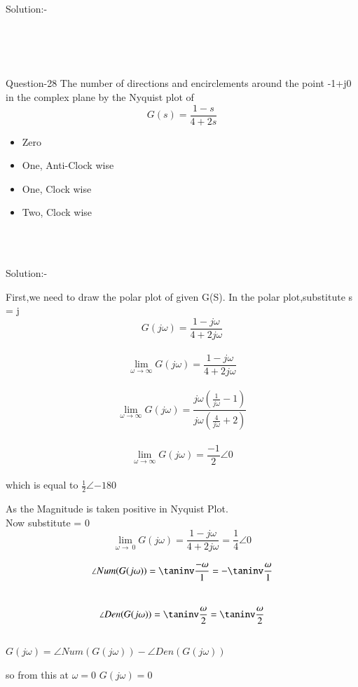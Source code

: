\documentclass[journal,12pt,twocolumn]{IEEEtran}
\begin{document}
\begin{frame}{Solution:- }
\begin{frame}{}
\end{frame}
\\\\\\
\begin{frame}{Question-28 }
The number of directions and encirclements around the point -1+j0 in the complex plane by the Nyquist plot of $$G(s) = \frac{1-s}{4+2s}$$

\bigskip
\begin{itemize}
    \item Zero
    \item One, Anti-Clock wise
    \item One, Clock wise
    \item Two, Clock wise
\end{itemize}
\end{frame}
\\\\
\begin{frame}{Solution:- }

First,we need to draw the polar plot of given G(S).
In the polar plot,substitute s = j\omega
\\
$$ G(j\omega) = \frac{1-j\omega}{4+2j\omega} $$
\\
$$ \lim_{\omega\to\infty} G(j\omega) = \frac{1-j\omega}{4+2j\omega} $$
\\
$$ \lim_{\omega\to\infty} G(j\omega) = \frac{j\omega(\frac{1}{j\omega}-1)}{j\omega(\frac{4}{j\omega}+2)} $$ 
\\
$$ \lim_{\omega\to\infty} G(j\omega) = \frac{-1}{2}\angle 0 $$ 
\\

\centering which is equal to $\frac{1}{2}\angle{-180}$
\end{frame}

\begin{frame}{}
As the Magnitude is taken positive in Nyquist Plot.\\
Now substitute \omega = 0
\\
$$ \lim_{\omega\to\ 0} G(j\omega) = \frac{1-j\omega}{4+2j\omega} = \frac{1}{4}\angle 0 $$

$$\angle Num(G(j\omega)) = \taninv \frac{-\omega}{1} = -\taninv \frac{\omega}{1}$$
\\
$$\angle Den(G(j\omega)) = \taninv \frac{\omega}{2} = \taninv \frac{\omega}{2}$$
\\
\angle $G(j\omega) = \angle Num(G(j\omega)) - \angle Den(G(j\omega))$

\bigskip
so from this  at $\omega = 0$ \angle $G(j\omega) = 0$


\end{frame}
\end{frame}
\end{document}
